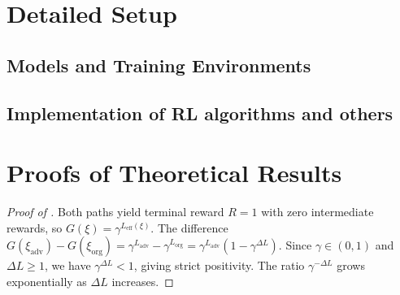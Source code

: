 \documentclass{article}
\begin{document}
\section{Detailed Setup}
\label{app:setup}

\subsection{Models and Training Environments}
\label{app:model}

\subsection{Implementation of RL algorithms and others}
\label{app:parameter}


\section{Proofs of Theoretical Results}
\label{app:proofs}

\begin{proof}[Proof of ]
Both paths yield terminal reward $R = 1$ with zero intermediate rewards, so $G(\xi) = \gamma^{L_{\mathrm{eff}}(\xi)}$.
The difference $G(\xi_{\mathrm{adv}}) - G(\xi_{\mathrm{org}}) = \gamma^{L_{\mathrm{adv}}} - \gamma^{L_{\mathrm{org}}} = \gamma^{L_{\mathrm{adv}}}(1 - \gamma^{\Delta L})$.
Since $\gamma \in (0,1)$ and $\Delta L \geq 1$, we have $\gamma^{\Delta L} < 1$, giving strict positivity.
The ratio $\gamma^{-\Delta L}$ grows exponentially as $\Delta L$ increases.
\end{proof}
\end{document}
